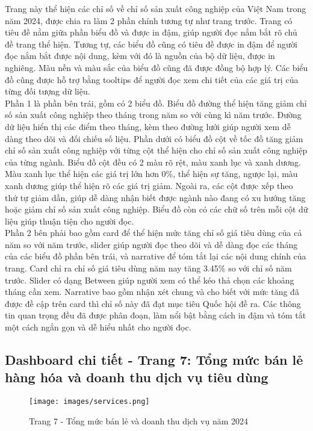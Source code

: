 \documentclass[a4paper]{report}
\begin{document}
{{Trang này thể hiện các chỉ số về chỉ số sản xuất công nghiệp của Việt Nam trong năm 2024, được chia ra làm 2 phần chính tương tự như trang trước. Trang có tiêu đề nằm giữa phần biểu đồ và được in đậm, giúp người đọc nắm bắt rõ chủ đề trang thể hiện. Tương tự, các biểu đồ cũng có tiêu đề được in đậm để người đọc nắm bắt được nội dung, kèm với đó là nguồn của bộ dữ liệu, được in nghiêng. Màu nền và màu sắc của biểu đồ cũng đã được đồng bộ hợp lý. Các biểu đồ cũng được hỗ trợ bằng tooltips để người đọc xem chi tiết của các giá trị của từng đối tượng dữ liệu. \\
Phần 1 là phần bên trái, gồm có 2 biểu đồ. Biểu đồ đường thể hiện tăng giảm chỉ số sản xuất công nghiệp theo tháng trong năm so với cùng kì năm trước. Đường dữ liệu hiển thị các điểm theo tháng, kèm theo đường lưới giúp người xem dễ dàng theo dõi và đối chiếu số liệu. Phần dưới có biểu đồ cột về tốc đồ tăng giảm chỉ số sản xuất công nghiệp với từng cột thể hiện cho chỉ số sản xuất công nghiệp của từng ngành. Biểu đồ cột đều có 2 màu rõ rệt, màu xanh lục và xanh dương. Màu xanh lục thể hiện các giá trị lớn hơn 0\%, thể hiện sự tăng, ngược lại, màu xanh dương giúp thể hiện rõ các giá trị giảm. Ngoài ra, các cột được xếp theo thứ tự giảm dần, giúp dễ dàng nhận biết được ngành nào đang có xu hướng tăng hoặc giảm chỉ số sản xuất công nghiệp. Biểu đồ còn có các chữ số trên mỗi cột dữ liệu giúp thuận tiện cho người đọc. \\
Phần 2 bên phải bao gồm card để thể hiện mức tăng chỉ số giá tiêu dùng của cả năm so với năm trước, slider giúp người đọc theo dõi và dễ dàng đọc các tháng của các biểu đồ phần bên trái, và narrative để tóm tắt lại các nội dung chính của trang. Card chỉ ra chỉ số giá tiêu dùng năm nay tăng 3.45\% so với chỉ số năm trước. Slider có dạng Between giúp người xem có thể kéo thả chọn các khoảng tháng cần xem. Narrative bao gồm nhận xét chung và cho biết với mức tăng đã được đề cập trên card thì chỉ số này đã đạt mục tiêu Quốc hội đề ra. Các thông tin quan trọng đều đã được phân đoạn, làm nổi bật bằng cách in đậm và tóm tắt một cách ngắn gọn và dễ hiểu nhất cho người đọc.
\newpage
\subsection{Dashboard chi tiết - Trang 7: Tổng mức bán lẻ hàng hóa và doanh thu dịch vụ tiêu dùng}

\begin{figure}[H]
    \centering
    \texttt{[image: images/services.png]}
    \caption{Trang 7 - Tổng mức bán lẻ và doanh thu dịch vụ năm 2024}
    \label{fig:enter-label}
\end{figure}

}}
\end{document}
